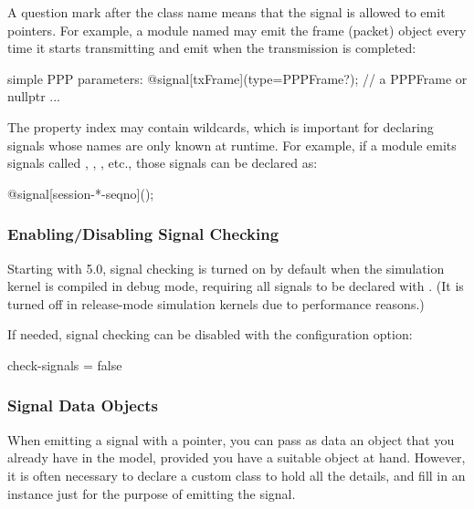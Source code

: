 A question mark after the class name means that the signal is allowed to
emit  pointers. For example, a module named  may emit
the frame (packet) object every time it starts transmitting and emit
 when the transmission is completed:

\begin{ned}
simple PPP
{
    parameters:
        @signal[txFrame](type=PPPFrame?);  // a PPPFrame or nullptr
        ...
}
\end{ned}

The property index may contain wildcards, which is important for declaring
signals whose names are only known at runtime. For example, if a module emits
signals called , , ,
etc., those signals can be declared as:

\begin{ned}
    @signal[session-*-seqno]();
\end{ned}


\subsubsection{Enabling/Disabling Signal Checking}
\label{sec:simple-modules:enabling-signal-checking}

Starting with {\opp} 5.0, signal checking is turned on by default when
the simulation kernel is compiled in debug mode, requiring all signals to be
declared with . (It is turned off in release-mode
simulation kernels due to performance reasons.)

If needed, signal checking can be disabled with the 
configuration option:

\begin{inifile}
check-signals = false
\end{inifile}


\subsubsection{Signal Data Objects}
\label{sec:simple-modules:signal-data-objects}

When emitting a signal with a  pointer, you can pass as data
an object that you already have in the model, provided you have a suitable
object at hand. However, it is often necessary to declare a custom class
to hold all the details, and fill in an instance just for the purpose of
emitting the signal.

